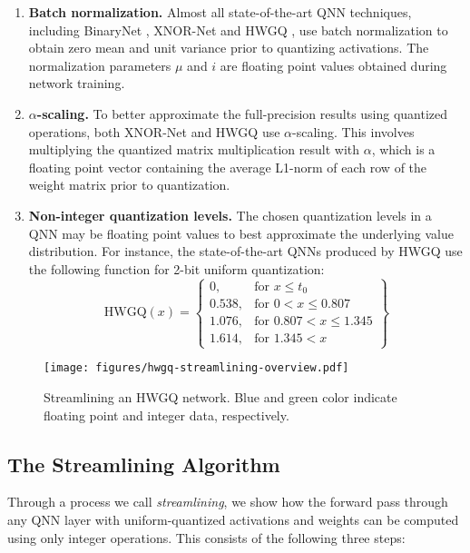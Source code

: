 \documentclass[sigconf]{acmart}
\begin{document}
\begin{enumerate}
	\item \textbf{Batch normalization.}
	Almost all state-of-the-art QNN techniques, including BinaryNet \cite{binarynet}, XNOR-Net \cite{xnornet} and HWGQ \cite{hwgq}, use batch normalization to obtain zero mean and unit variance prior to quantizing activations.
	The normalization parameters $\mu$ and $i$ are floating point values obtained during network training.

	\item \textbf{$\alpha$-scaling.}
	To better approximate the full-precision results using quantized operations, both XNOR-Net \cite{xnornet} and HWGQ \cite{hwgq} use $\alpha$-scaling.
	This involves multiplying the quantized matrix multiplication result with $\alpha$, which is a floating point vector containing the average L1-norm of each row of the weight matrix prior to quantization.

	\item \textbf{Non-integer quantization levels.}
	The chosen quantization levels in a QNN may be floating point values to best approximate the underlying value distribution.
	For instance, the state-of-the-art QNNs produced by HWGQ \cite{hwgq} use the following function for 2-bit uniform quantization:
	\[
	\mathrm{HWGQ}(x) = \left\{\begin{array}{lr}
	0, & \text{for } x \leq t_0\\
	0.538, & \text{for } 0 < x \leq 0.807\\
	1.076, & \text{for } 0.807 < x \leq 1.345\\
	1.614, & \text{for } 1.345 < x
	\end{array}\right\}
	\]
\end{enumerate}

\begin{figure}
\centering
\texttt{[image: figures/hwgq-streamlining-overview.pdf]}
\caption{Streamlining an HWGQ network. Blue and green color indicate floating point and integer data, respectively.}
\label{fig:hwgq-streamlining-overview}
\end{figure}

\subsection{The Streamlining Algorithm}
Through a process we call \emph{streamlining}, we show how the forward pass through any QNN layer with uniform-quantized activations and weights can be computed using only integer operations.
This consists of the following three steps:
\end{document}
